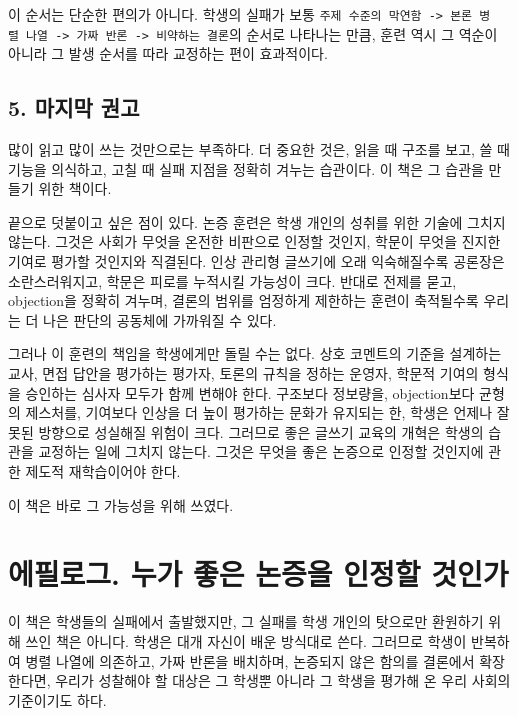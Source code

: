 이 순서는 단순한 편의가 아니다. 학생의 실패가 보통 \texttt{주제\ 수준의\ 막연함\ -\textgreater{}\ 본론\ 병렬\ 나열\ -\textgreater{}\ 가짜\ 반론\ -\textgreater{}\ 비약하는\ 결론}의 순서로 나타나는 만큼, 훈련 역시 그 역순이 아니라 그 발생 순서를 따라 교정하는 편이 효과적이다.

\section{5. 마지막 권고}\label{5-uxb9c8uxc9c0uxb9c9-uxad8cuxace0}

많이 읽고 많이 쓰는 것만으로는 부족하다. 더 중요한 것은, 읽을 때 구조를 보고, 쓸 때 기능을 의식하고, 고칠 때 실패 지점을 정확히 겨누는 습관이다. 이 책은 그 습관을 만들기 위한 책이다.

끝으로 덧붙이고 싶은 점이 있다. 논증 훈련은 학생 개인의 성취를 위한 기술에 그치지 않는다. 그것은 사회가 무엇을 온전한 비판으로 인정할 것인지, 학문이 무엇을 진지한 기여로 평가할 것인지와 직결된다. 인상 관리형 글쓰기에 오래 익숙해질수록 공론장은 소란스러워지고, 학문은 피로를 누적시킬 가능성이 크다. 반대로 전제를 묻고, objection을 정확히 겨누며, 결론의 범위를 엄정하게 제한하는 훈련이 축적될수록 우리는 더 나은 판단의 공동체에 가까워질 수 있다.

그러나 이 훈련의 책임을 학생에게만 돌릴 수는 없다. 상호 코멘트의 기준을 설계하는 교사, 면접 답안을 평가하는 평가자, 토론의 규칙을 정하는 운영자, 학문적 기여의 형식을 승인하는 심사자 모두가 함께 변해야 한다. 구조보다 정보량을, objection보다 균형의 제스처를, 기여보다 인상을 더 높이 평가하는 문화가 유지되는 한, 학생은 언제나 잘못된 방향으로 성실해질 위험이 크다. 그러므로 좋은 글쓰기 교육의 개혁은 학생의 습관을 교정하는 일에 그치지 않는다. 그것은 무엇을 좋은 논증으로 인정할 것인지에 관한 제도적 재학습이어야 한다.

이 책은 바로 그 가능성을 위해 쓰였다.

\chapter{에필로그. 누가 좋은 논증을 인정할 것인가}\label{uxc5d0uxd544uxb85cuxadf8-uxb204uxac00-uxc88buxc740-uxb17cuxc99duxc744-uxc778uxc815uxd560-uxac83uxc778uxac00}

이 책은 학생들의 실패에서 출발했지만, 그 실패를 학생 개인의 탓으로만 환원하기 위해 쓰인 책은 아니다. 학생은 대개 자신이 배운 방식대로 쓴다. 그러므로 학생이 반복하여 병렬 나열에 의존하고, 가짜 반론을 배치하며, 논증되지 않은 함의를 결론에서 확장한다면, 우리가 성찰해야 할 대상은 그 학생뿐 아니라 그 학생을 평가해 온 우리 사회의 기준이기도 하다.

